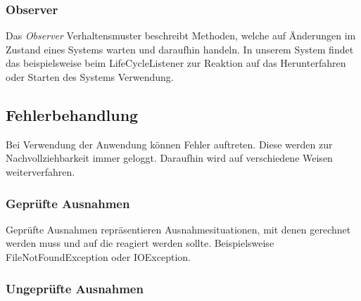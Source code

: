 \subsubsection{Observer}
Das \emph{Observer} Verhaltensmuster beschreibt Methoden, welche auf
Änderungen im Zustand eines Systems warten und daraufhin handeln.
In unserem System findet das beispielsweise beim LifeCycleListener %
zur Reaktion auf das Herunterfahren oder Starten des Systems Verwendung.

\subsection{Fehlerbehandlung}
Bei Verwendung der Anwendung können Fehler auftreten. Diese werden zur Nachvollziehbarkeit
immer geloggt. Daraufhin wird auf verschiedene Weisen weiterverfahren.

\subsubsection{Geprüfte Ausnahmen}
Geprüfte Ausnahmen repräsentieren Ausnahmesituationen, mit
denen gerechnet werden muss und auf die reagiert werden sollte.
Beispielsweise FileNotFoundException oder IOException.

\subsubsection{Ungeprüfte Ausnahmen}